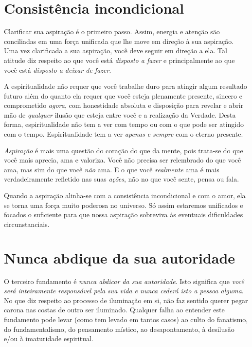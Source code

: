 \section*{Consistência incondicional}

Clarificar sua aspiração é o primeiro passo. Assim, energia e atenção são conciliadas em uma força unificada que lhe move em direção à sua aspiração. Uma vez clarificada a sua aspiração, você deve seguir em direção a ela. Tal atitude diz respeito ao que você está \emph{disposto a fazer} e principalmente ao que você está \emph{disposto a deixar de fazer}.

A espiritualidade não requer que você trabalhe duro para atingir algum resultado futuro além do quanto ela requer que você esteja plenamente presente, sincero e comprometido \emph{agora}, com honestidade absoluta e disposição para revelar e abrir mão de \emph{qualquer} ilusão que esteja entre você e a realização da Verdade. Desta forma, espiritualidade não tem a ver com tempo ou com o que pode ser atingido com o tempo. Espiritualidade tem a ver \emph{apenas e sempre} com o eterno presente.

\emph{Aspiração} é mais uma questão do coração do que da mente, pois trata-se do que você mais aprecia, ama e valoriza. Você não precisa ser relembrado do que você ama, mas sim do que você \emph{não} ama. E o que você \emph{realmente} ama é mais verdadeiramente refletido nas suas \emph{ações}, não no que você sente, pensa ou fala.

Quando a aspiração alinha-se com a consistência incondicional e com o amor, ela se torna uma força muito poderosa no universo. Só assim estaremos unificados e focados o suficiente para que nossa aspiração sobreviva às eventuais dificuldades circunstanciais.

\section*{Nunca abdique da sua autoridade}

O terceiro fundamento é \emph{nunca abdicar da sua autoridade}. Isto significa que \emph{você será inteiramente responsável pela sua vida e nunca cederá isto a pessoa alguma}. No que diz respeito ao processo de iluminação em si, não faz sentido querer pegar carona nas costas de outro ser iluminado. Qualquer falha ao entender este fundamento pode levar (como tem levado em tantos casos) ao culto do fanatismo, do fundamentalismo, do pensamento místico, ao desapontamento, à desilusão e/ou à imaturidade espiritual.

